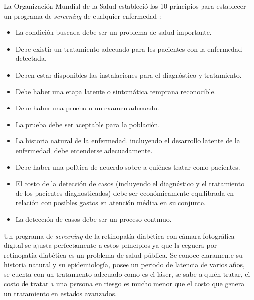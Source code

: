 La Organización Mundial de la Salud \cite{oms} estableció los 10 principios para establecer un programa de \textit{screening} de cualquier enfermedad \cite{zavon1969principles,wilson1968principles}: 
\begin{itemize}
\item La condición buscada debe ser un problema de salud importante. 
\item Debe existir  un tratamiento adecuado para los pacientes con la enfermedad detectada.
\item  Deben estar disponibles  las instalaciones para el diagnóstico y tratamiento. 
\item  Debe haber una etapa latente o sintomática temprana reconocible. 
\item  Debe haber una prueba o un examen adecuado.
\item  La prueba debe ser aceptable para la población. 
\item  La historia natural de la enfermedad, incluyendo el desarrollo latente de  la enfermedad, debe entenderse adecuadamente. 
\item  Debe haber una política de acuerdo sobre a quiénes tratar como pacientes. 
\item  El costo de la detección de casos (incluyendo el diagnóstico y el tratamiento de los pacientes diagnosticados) debe ser económicamente equilibrada en relación con posibles gastos en atención médica en su conjunto. 
\item La detección de casos debe ser un proceso continuo. 
\end{itemize}
Un programa de \textit{screening} de la retinopatía diabética
con cámara fotográfica digital se ajusta perfectamente a estos principios \cite{vision2020la} ya que la ceguera por retinopatía diabética es un problema de salud pública. Se conoce claramente su historia natural y su epidemiología, posee un periodo de latencia de varios años, se cuenta con un tratamiento adecuado como es el láser, se sabe a quién tratar, el costo de tratar a una persona en riesgo es mucho menor que el costo que genera un tratamiento en estados avanzados. %

